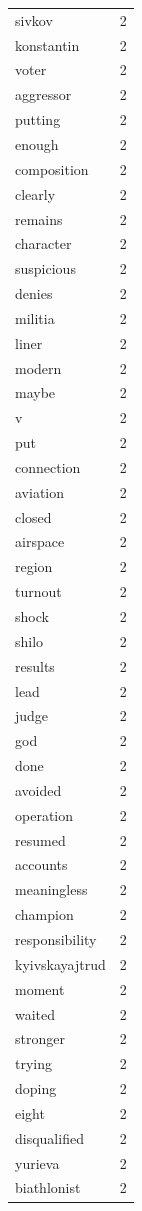 \begin{tabular}{lr}
sivkov & 2 \\
konstantin & 2 \\
voter & 2 \\
aggressor & 2 \\
putting & 2 \\
enough & 2 \\
composition & 2 \\
clearly & 2 \\
remains & 2 \\
character & 2 \\
suspicious & 2 \\
denies & 2 \\
militia & 2 \\
liner & 2 \\
modern & 2 \\
maybe & 2 \\
v & 2 \\
put & 2 \\
connection & 2 \\
aviation & 2 \\
closed & 2 \\
airspace & 2 \\
region & 2 \\
turnout & 2 \\
shock & 2 \\
shilo & 2 \\
results & 2 \\
lead & 2 \\
judge & 2 \\
god & 2 \\
done & 2 \\
avoided & 2 \\
operation & 2 \\
resumed & 2 \\
accounts & 2 \\
meaningless & 2 \\
champion & 2 \\
responsibility & 2 \\
kyivskayajtrud & 2 \\
moment & 2 \\
waited & 2 \\
stronger & 2 \\
trying & 2 \\
doping & 2 \\
eight & 2 \\
disqualified & 2 \\
yurieva & 2 \\
biathlonist & 2 \\

\end{tabular}
